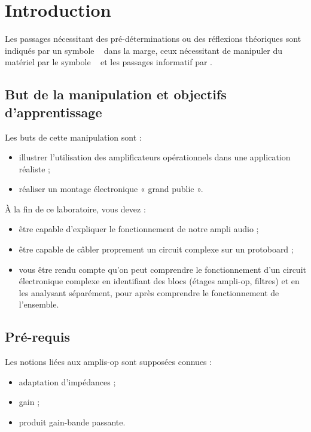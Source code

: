 
\vspace{5cm}
\newpage

\section{Introduction}

Les passages nécessitant des pré-déterminations ou des réflexions théoriques sont indiqués par un symbole \faCogs~ dans la marge,
ceux nécessitant de manipuler du matériel par le symbole \faFlask~ et les passages informatif par \faLightbulbO.

\subsection{But de la manipulation et objectifs d'apprentissage}

Les buts de cette manipulation sont :
\begin{itemize}
	\item illustrer l'utilisation des amplificateurs opérationnels dans une application réaliste ;
	\item réaliser un montage électronique « grand public ».
\end{itemize}

À la fin de ce laboratoire, vous devez  :
\vspace{3mm}
\begin{itemize}
\item être capable d'expliquer le fonctionnement de notre ampli audio ;
\item être capable de câbler proprement un circuit complexe sur un protoboard ;
\item vous être rendu compte qu'on peut comprendre le fonctionnement d'un circuit électronique complexe en identifiant des blocs (étages ampli-op, filtres) et en les analysant séparément, pour après comprendre le fonctionnement de l'ensemble.
\end{itemize}

\subsection{Pré-requis}
Les notions liées aux amplis-op sont supposées connues :
\begin{itemize}
\item adaptation d'impédances ;
\item gain ;
\item produit gain-bande passante.
\end{itemize}

